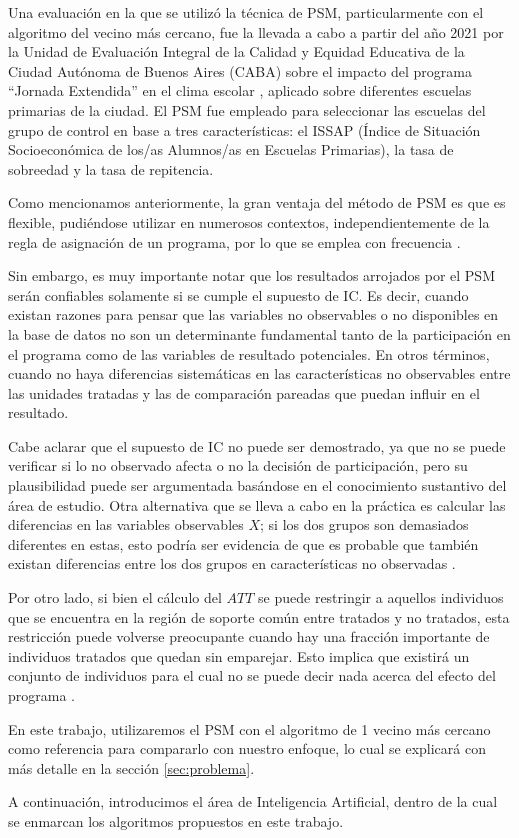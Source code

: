 \documentclass[../../main.tex]{subfiles}
\begin{document}
Una evaluación en la que se utilizó la técnica de PSM, particularmente con el algoritmo
del vecino más cercano, fue la llevada a cabo a partir del año 2021 por la Unidad de
Evaluación Integral de la Calidad y Equidad Educativa de la Ciudad Autónoma de Buenos
Aires (CABA) sobre el impacto del programa ``Jornada Extendida'' en el clima escolar
\cite{ueicee2023jornada}, aplicado sobre diferentes escuelas primarias de la ciudad. El
PSM fue empleado para seleccionar las escuelas del grupo de control en base a tres
características: el ISSAP (Índice de Situación Socioeconómica de los/as Alumnos/as en
Escuelas Primarias), la tasa de sobreedad y la tasa de repitencia.

Como mencionamos anteriormente, la gran ventaja del método de PSM es que es flexible,
pudiéndose utilizar en numerosos contextos, independientemente de la regla de asignación
de un programa, por lo que se emplea con frecuencia \cite{bernal}.

Sin embargo, es muy importante notar que los resultados arrojados por el PSM serán
confiables solamente si se cumple el supuesto de IC. Es decir, cuando existan razones para
pensar que las variables no observables o no disponibles en la base de datos no son un
determinante fundamental tanto de la participación en el programa como de las variables de
resultado potenciales. En otros términos, cuando no haya diferencias sistemáticas en las
características no observables entre las unidades tratadas y las de comparación pareadas
que puedan influir en el resultado.

Cabe aclarar que el supuesto de IC no puede ser demostrado, ya que no se puede verificar
si lo no observado afecta o no la decisión de participación, pero su plausibilidad puede
ser argumentada basándose en el conocimiento sustantivo del área de estudio. Otra
alternativa que se lleva a cabo en la práctica es calcular las diferencias en las
variables observables \(X\); si los dos grupos son demasiados diferentes en estas, esto
podría ser evidencia de que es probable que también existan diferencias entre los dos
grupos en características no observadas \cite{bernal}.

Por otro lado, si bien el cálculo del \(ATT\) se puede restringir a aquellos individuos
que se encuentra en la región de soporte común entre tratados y no tratados, esta
restricción puede volverse preocupante cuando hay una fracción importante de individuos
tratados que quedan sin emparejar. Esto implica que existirá un conjunto de individuos
para el cual no se puede decir nada acerca del efecto del programa \cite{bernal}.

\bigskip
En este trabajo, utilizaremos el PSM con el algoritmo de 1 vecino más cercano como
referencia para compararlo con nuestro enfoque, lo cual se explicará con más detalle en la
sección \ref{sec:problema}.

A continuación, introducimos el área de Inteligencia Artificial, dentro de la cual se
enmarcan los algoritmos propuestos en este trabajo.
\end{document}
